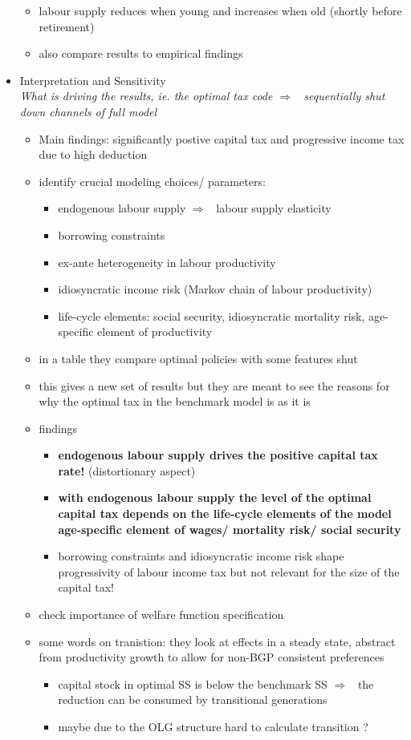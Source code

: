 \documentclass[12pt]{article}
\newcommand{\ar}{$\Rightarrow$ \ }
\begin{document}
\begin{itemize}
\begin{itemize}
\item labour supply reduces when young and increases when old (shortly before retirement)
\item also compare results to empirical findings
\end{itemize}
\item Interpretation and Sensitivity\\ \textit{What is driving the results, ie. the optimal tax code \ar sequentially shut down channels of full model}
\begin{itemize}
\item Main findings: significantly postive capital tax and progressive income tax due to high deduction
\item identify crucial modeling choices/ parameters: 
\begin{itemize}
\item endogenous labour supply \ar labour supply elasticity
\item  borrowing constraints
\item ex-ante heterogeneity in labour productivity
\item idiosyncratic income risk (Markov chain of labour productivity)
\item life-cycle elements: social security, idiosyncratic mortality risk, age-specific element of productivity 
\end{itemize}
\item in a table they compare optimal policies with some features shut 
\item this gives a new set of results but they are meant to see the reasons for why the optimal tax in the benchmark model is as it is
\item findings
\begin{itemize}
\item \textbf{endogenous labour supply drives the positive capital tax rate! }(distortionary aspect)
\item \textbf{with endogenous labour supply the level of the optimal capital tax depends on the life-cycle elements of the model age-specific element of wages/ mortality risk/ social security}
\item borrowing constraints and idiosyncratic income risk shape progressivity of labour income tax but not relevant for the size of the capital tax!
\end{itemize}
\item check importance of welfare function specification
\item some words on tranistion: they look at effects in a steady state, abstract from productivity growth to allow for non-BGP consistent preferences
\begin{itemize}
\item capital stock in optimal SS is below the benchmark SS \ar the reduction can be consumed by transitional generations
\item maybe due to the OLG structure hard to calculate transition ?
\end{itemize}
\end{itemize}
\end{itemize}
\end{document}

